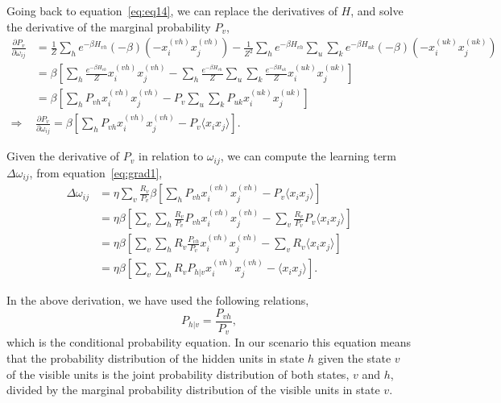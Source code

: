 Going back to equation~\ref{eq:eq14}, we can replace the derivatives of $H$, and solve the derivative of the marginal probability $P_{v}$,
\begin{equation}
  \begin{split}
    \frac{\partial P_{v}}{\partial \omega_{ij}} & = \frac{1}{Z} \sum_{h} e^{-\beta H_{vh}} (-\beta) (-x^{(vh)}_{i} x^{(vh)}_{j}) - \frac{1}{Z^{2}} \sum_{h} e^{-\beta H_{vh}} \sum_{u} \sum_{k} e^{-\beta H_{uk}} (-\beta) (-x^{(uk)}_{i} x^{(uk)}_{j}) \\
    & = \beta \left[ \sum_{h} \frac{e^{-\beta H_{vh}}}{Z} x^{(vh)}_{i} x^{(vh)}_{j} - \sum_{h} \frac{e^{-\beta H_{vh}}}{Z} \sum_{u} \sum_{k} \frac{e^{-\beta H_{uk}}}{Z} x^{(uk)}_{i} x^{(uk)}_{j}  \right] \\
    & = \beta \left[ \sum_{h} P_{vh} x^{(vh)}_{i} x^{(vh)}_{j} - P_{v} \sum_{u} \sum_{k} P_{uk} x^{(uk)}_{i} x^{(uk)}_{j} \right] \\
    \Rightarrow & \frac{\partial P_{v}}{\partial \omega_{ij}} = \beta \left[ \sum_{h} P_{vh} x^{(vh)}_{i} x^{(vh)}_{j} - P_{v} \langle x_{i} x_{j} \rangle  \right].
  \end{split}
  \label{eq:eq18}
\end{equation}

Given the derivative of $P_{v}$ in relation to $\omega_{ij}$, we can compute the learning term $\Delta \omega_{ij}$, from equation~\ref{eq:grad1},
\begin{equation}
  \begin{split}
    \Delta \omega_{ij} & = \eta \sum_{v} \frac{R_{v}}{P_{v}} \beta \left[ \sum_{h} P_{vh} x^{(vh)}_{i} x^{(vh)}_{j} - P_{v} \langle x_{i} x_{j} \rangle \right]  \\
    & = \eta \beta \left[ \sum_{v} \sum_{h} \frac{R_{v}}{P_{v}} P_{vh} x^{(vh)}_{i} x^{(vh)}_{j} - \sum_{v} \frac{R_{v}}{P_{v}} P_{v} \langle x_{i} x_{j} \rangle \right] \\
    & = \eta \beta \left[ \sum_{v} \sum_{h} R_{v} \frac{P_{vh}}{P_{v}} x^{(vh)}_{i} x^{(vh)}_{j} - \sum_{v} R_{v} \langle x_{i} x_{j} \rangle \right] \\
    & = \eta \beta \left[ \sum_{v} \sum_{h} R_{v} P_{h|v} x^{(vh)}_{i} x^{(vh)}_{j} - \langle x_{i} x_{j} \rangle \right].
  \end{split}
  \label{eq:learning_term2}
\end{equation}

In the above derivation, we have used the following relations,
\begin{equation}
  P_{h|v} = \frac{P_{vh}}{P_{v}},
  \label{eq:conditional_prob1}
\end{equation}
which is the conditional probability equation.
In our scenario this equation means that the probability distribution of the hidden units in state $h$ given the state $v$ of the visible units is the joint probability distribution of both states, $v$ and $h$, divided by the marginal probability distribution of the visible units in state $v$.

